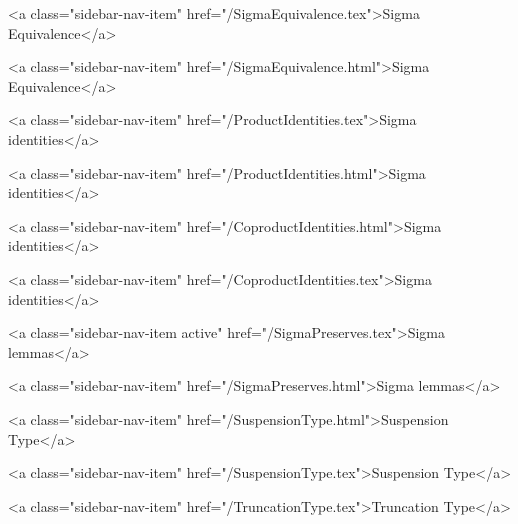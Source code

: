       
    
      
        
          <a class="sidebar-nav-item" href="/SigmaEquivalence.tex">Sigma Equivalence</a>
        
      
    
      
        
          <a class="sidebar-nav-item" href="/SigmaEquivalence.html">Sigma Equivalence</a>
        
      
    
      
        
          <a class="sidebar-nav-item" href="/ProductIdentities.tex">Sigma identities</a>
        
      
    
      
        
          <a class="sidebar-nav-item" href="/ProductIdentities.html">Sigma identities</a>
        
      
    
      
        
          <a class="sidebar-nav-item" href="/CoproductIdentities.html">Sigma identities</a>
        
      
    
      
        
          <a class="sidebar-nav-item" href="/CoproductIdentities.tex">Sigma identities</a>
        
      
    
      
        
          <a class="sidebar-nav-item active" href="/SigmaPreserves.tex">Sigma lemmas</a>
        
      
    
      
        
          <a class="sidebar-nav-item" href="/SigmaPreserves.html">Sigma lemmas</a>
        
      
    
      
        
          <a class="sidebar-nav-item" href="/SuspensionType.html">Suspension Type</a>
        
      
    
      
        
          <a class="sidebar-nav-item" href="/SuspensionType.tex">Suspension Type</a>
        
      
    
      
        
          <a class="sidebar-nav-item" href="/TruncationType.tex">Truncation Type</a>
        
